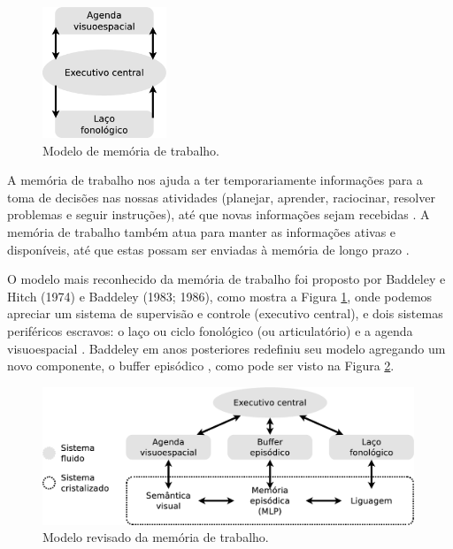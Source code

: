 \begin{figure}
  \centering
    \includegraphics[width=0.33\textwidth]{chapters/cap-learning/memory-mcp.eps}
\caption{Modelo de memória de trabalho.}
\label{fig:memory-mcp}
\end{figure}
A memória de trabalho nos ajuda a ter temporariamente informações para a toma de decisões nas
nossas atividades (planejar, aprender, raciocinar, resolver problemas e seguir instruções),
até que novas informações sejam recebidas 
\cite[pp. 678]{spreen2006compendium} \cite[pp. 266]{braisby2012cognitive}.
A memória de trabalho também atua para manter as informações ativas e disponíveis,
 até que estas possam ser enviadas à memória de longo prazo
\cite[pp. 678]{spreen2006compendium}.

O modelo mais reconhecido da memória de trabalho foi proposto por Baddeley e Hitch  (1974)
e Baddeley (1983; 1986), como mostra a Figura \ref{fig:memory-mcp},
onde podemos apreciar um sistema de  supervisão e controle (executivo central),
e dois sistemas periféricos escravos:
o laço ou ciclo fonológico (ou articulatório) e a agenda visuoespacial
\cite[pp. 678]{spreen2006compendium} \cite[pp. 266, 272, 273]{braisby2012cognitive}.
Baddeley em anos posteriores redefiniu seu modelo agregando um novo componente, 
o buffer episódico \cite[pp. 284]{braisby2012cognitive} \cite[pp. 678]{spreen2006compendium} \cite[pp. 122]{pake2019psicologia},
como pode ser visto na Figura \ref{fig:memory-working}.
\begin{figure}[!h]
  \centering
    \includegraphics[width=0.99\textwidth]{chapters/cap-learning/memory-working.eps}
\caption{Modelo revisado da memória de trabalho.}
\label{fig:memory-working}
\end{figure}

